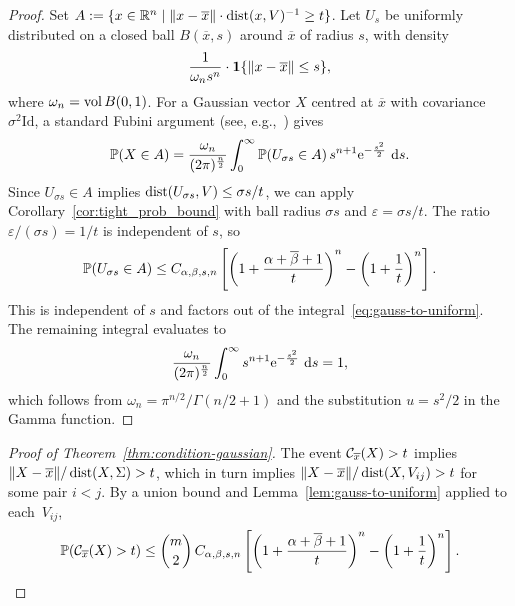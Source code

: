 \begin{proof}
Set $A:=\{x\in \mathbb{R}^{n} \mathrel{|} \|x-\overline{x}\|\cdot \operatorname{dist}(x,V)^{-1}\geq t\}$.
Let $U_{s}$ be uniformly distributed on a closed ball $B(\overline{x},s)$ around $\overline{x}$ of radius $s$, with density
\begin{equation*}
  \frac{1}{\omega_n s^{n}}\cdot \bm{1}\{\|x-\overline{x}\|\leq s\},
\end{equation*}
where $\omega_n = \operatorname{vol} B(0,1)$.
For a Gaussian vector $X$ centred at $\overline{x}$ with covariance $\sigma^2\mathrm{Id}$, a standard Fubini argument (see, e.g.,~\cite{burgisser2013condition}) gives
\begin{equation}\label{eq:gauss-to-uniform}
 \Prob(X\in A) = \frac{\omega_n}{(2\pi)^{\frac{n}{2}}}\int_{0}^{\infty} \Prob(U_{\sigma s}\in A)\, s^{n+1} \econst^{-\frac{s^2}{2}} \ \diff{s}.
\end{equation}
Since $U_{\sigma s}\in A$ implies $\operatorname{dist}(U_{\sigma s},V)\leq \sigma s/t$, we can apply Corollary~\ref{cor:tight_prob_bound} with ball radius $\sigma s$ and $\varepsilon = \sigma s/t$. The ratio $\varepsilon/(\sigma s) = 1/t$ is independent of $s$, so
\begin{equation*}
  \mathbb{P}(U_{\sigma s}\in A) \leq C_{\alpha,\beta,s,n}\left[\left(1+\frac{\alpha+\overline{\beta}+1}{t}\right)^n - \left(1+\frac{1}{t}\right)^n\right].
\end{equation*}
This is independent of $s$ and factors out of the integral~\eqref{eq:gauss-to-uniform}. The remaining integral evaluates to
\begin{equation*}
  \frac{\omega_n}{(2\pi)^{\frac{n}{2}}}\int_{0}^{\infty} s^{n+1} \mathrm{e}^{-\frac{s^2}{2}} \ \mathrm{d}{s} = 1,
\end{equation*}
which follows from $\omega_n = \pi^{n/2}/\Gamma(n/2+1)$ and the substitution $u=s^2/2$ in the Gamma function.
\end{proof}

\begin{proof}[Proof of Theorem~\ref{thm:condition-gaussian}]
The event $\mathcal{C}_{\overline{x}}(X) > t$ implies $\|X - \overline{x}\|/\operatorname{dist}(X,\Sigma) > t$, which in turn implies $\|X-\overline{x}\|/\operatorname{dist}(X,V_{ij}) > t$ for some pair $i < j$. By a union bound and Lemma~\ref{lem:gauss-to-uniform} applied to each~$V_{ij}$,
\begin{equation*}
  \mathbb{P}(\mathcal{C}_{\overline{x}}(X) > t) \leq \binom{m}{2}\, C_{\alpha,\beta,s,n}\left[\left(1+\frac{\alpha+\overline{\beta}+1}{t}\right)^n - \left(1+\frac{1}{t}\right)^n\right]. \qedhere
\end{equation*}
\end{proof}


